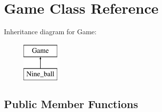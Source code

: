 \hypertarget{class_game}{
\section{Game Class Reference}
\label{class_game}
}
Inheritance diagram for Game:\begin{figure}[H]
\begin{center}
\leavevmode
\includegraphics[height=2.000000cm]{class_game}
\end{center}
\end{figure}
\subsection*{Public Member Functions}
